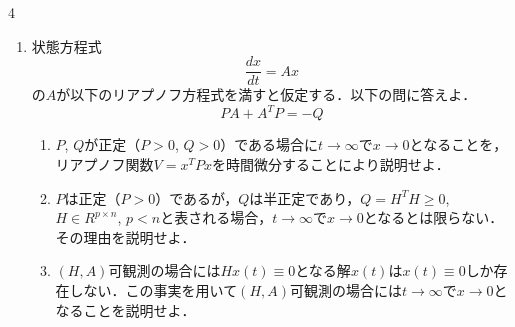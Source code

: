 \begin{multicols}{4}
\begin{enumerate}
{\begin{align*}
\begin{array}{c}
	         y_0 \\
		     y_1 \\
		     y_2 \\
		     \frac{dy_0}{dt} \\
		     \frac{dy_1}{dt} \\
		     \frac{dy_2}{dt}
       \end{array}\right)
\end{align*}
}\\[-0.5cm]
となる．以下の問いに答えよ．
\begin{enumerate}
\item 
$(m_0, m_1, m_2, k_1, k_2)=(1,1,2,2,1)$の場合，可観測であるか否かを判断せよ．
\vspace{9cm}

\item
$(m_0, m_1, m_2, k_1, k_2)=(1,1,2,1,2)$の場合，可観測であるか否かを判断せよ．
\vspace*{9cm}

\end{enumerate}





\item
状態方程式
\[
	\frac{dx}{dt}= Ax
\]
の$A$が以下のリアプノフ方程式を満すと仮定する．以下の問に答えよ．
\[
	PA + A^T P = -Q
\]
\begin{enumerate}
\item 
$P$, $Q$が正定（$P>0$, $Q>0$）である場合に$t \rightarrow \infty$で$x \rightarrow 0$となることを，リアプノフ関数$V=x^T P x$を時間微分することにより説明せよ．
\vspace{7cm}

\item
$P$は正定（$P>0$）であるが，$Q$は半正定であり，$Q=H^T H \geq 0$, $H \in R^{p \times n}$, $p < n$と表される場合，$t \rightarrow \infty$で$x \rightarrow 0$となるとは限らない．その理由を説明せよ．
\vspace{4cm}

\vfill\null
\columnbreak

\item
$(H,A)$可観測の場合には$Hx(t)\equiv0$となる解$x(t)$は$x(t)\equiv0$しか存在しない．この事実を用いて$(H,A)$可観測の場合には$t \rightarrow \infty$で$x \rightarrow 0$となることを説明せよ．
\vspace{5cm}
\end{enumerate}



\end{enumerate}
\end{multicols}
